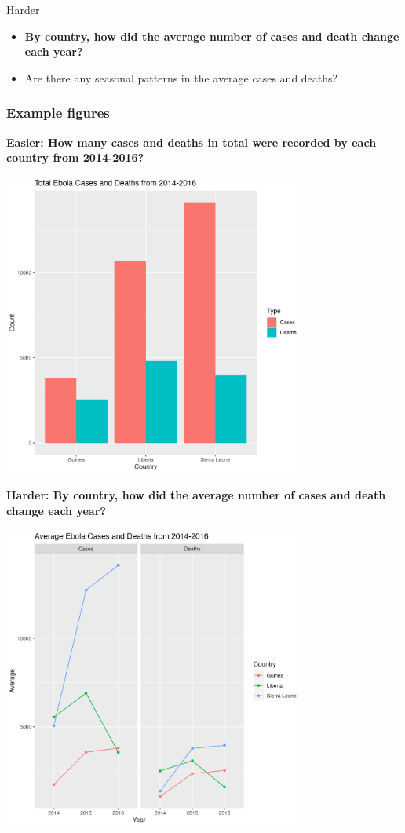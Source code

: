 \documentclass[
  letterpaper,
  DIV=11,
  numbers=noendperiod]{scrreprt}
\providecommand{\tightlist}{%
  \setlength{\itemsep}{0pt}\setlength{\parskip}{0pt}}\usepackage{longtable,booktabs,array}
\begin{document}
\begin{tcolorbox}
Harder

\begin{itemize}
\tightlist
\item
  \textbf{By country, how did the average number of cases and death
  change each year?}
\item
  Are there any seasonal patterns in the average cases and deaths?
\end{itemize}

\subsubsection{Example figures}

\textbf{Easier: How many cases and deaths in total were recorded by each
country from 2014-2016?}

\includegraphics[width=0.75\textwidth,height=\textheight]{scripts/04_projects/project-day-2_files/figs/ebola-easy.png}

\textbf{Harder: By country, how did the average number of cases and
death change each year?}

\includegraphics[width=0.75\textwidth,height=\textheight]{scripts/04_projects/project-day-2_files/figs/ebola-hard.png}

\end{tcolorbox}
\end{document}
